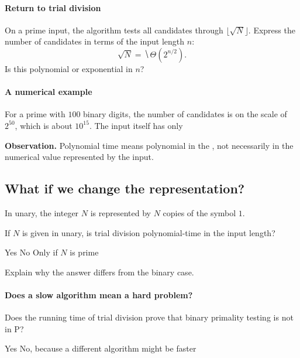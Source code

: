 \documentclass[11  pt]{article}
\begin{document}
\paragraph{Return to trial division}
On a prime input, the algorithm tests all candidates through $\lfloor\sqrt N\rfloor$. Express the number of candidates in terms of the input length $n$:
\begin{equation*}
    \sqrt N=\hide{\Theta(2^{n/2})}.
\end{equation*}
Is this polynomial or exponential in $n$?
\vs{1cm}

\paragraph{A numerical example}
For a prime with $100$ binary digits, the number of candidates is on the scale of $2^{50}$, which is about $10^{15}$. The input itself has only 

\vfill
\textbf{Observation.} Polynomial time means polynomial in the , not necessarily in the numerical value represented by the input.

\newpage
\subsection*{What if we change the representation?}
In unary, the integer $N$ is represented by $N$ copies of the symbol $1$.

\begin{Qu}
    If $N$ is given in unary, is trial division polynomial-time in the input length?
    \begin{itemize}
        \aitem Yes
        \bitem No
        \citem Only if $N$ is prime
    \end{itemize}
\end{Qu}
Explain why the answer differs from the binary case.
\vs{1cm}

\paragraph{Does a slow algorithm mean a hard problem?}
\begin{Qu}
    Does the running time of trial division prove that binary primality testing is not in $\mathrm{P}$?
    \begin{itemize}
        \aitem Yes
        \bitem No, because a different algorithm might be faster
    \end{itemize}
\end{Qu}
\end{document}
